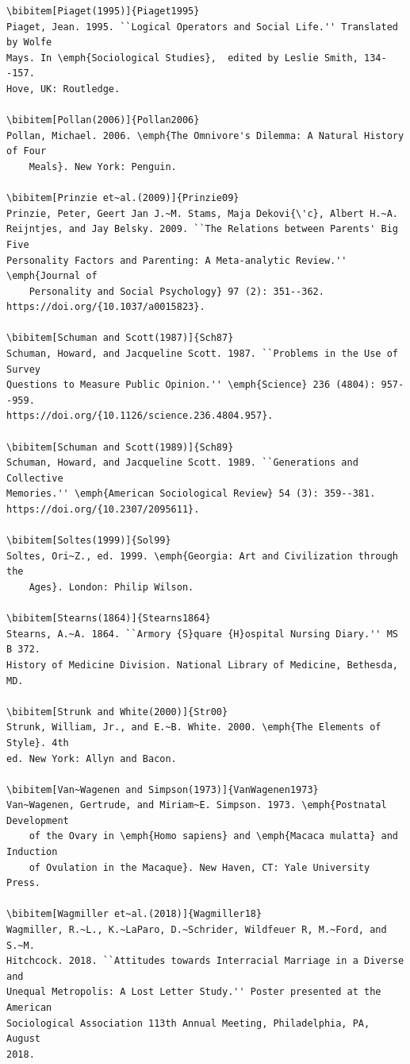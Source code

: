 \documentclass[]{interact}
\theoremstyle{plain}%
\theoremstyle{definition}
\theoremstyle{remark}
\begin{document}
\begin{verbatim}
\bibitem[Piaget(1995)]{Piaget1995}
Piaget, Jean. 1995. ``Logical Operators and Social Life.'' Translated by Wolfe
Mays. In \emph{Sociological Studies},  edited by Leslie Smith, 134--157.
Hove, UK: Routledge.

\bibitem[Pollan(2006)]{Pollan2006}
Pollan, Michael. 2006. \emph{The Omnivore's Dilemma: A Natural History of Four
	Meals}. New York: Penguin.

\bibitem[Prinzie et~al.(2009)]{Prinzie09}
Prinzie, Peter, Geert Jan J.~M. Stams, Maja Dekovi{\'c}, Albert H.~A.
Reijntjes, and Jay Belsky. 2009. ``The Relations between Parents' Big Five
Personality Factors and Parenting: A Meta-analytic Review.'' \emph{Journal of
	Personality and Social Psychology} 97 (2): 351--362.
https://doi.org/{10.1037/a0015823}.

\bibitem[Schuman and Scott(1987)]{Sch87}
Schuman, Howard, and Jacqueline Scott. 1987. ``Problems in the Use of Survey
Questions to Measure Public Opinion.'' \emph{Science} 236 (4804): 957--959.
https://doi.org/{10.1126/science.236.4804.957}.

\bibitem[Schuman and Scott(1989)]{Sch89}
Schuman, Howard, and Jacqueline Scott. 1989. ``Generations and Collective
Memories.'' \emph{American Sociological Review} 54 (3): 359--381.
https://doi.org/{10.2307/2095611}.

\bibitem[Soltes(1999)]{Sol99}
Soltes, Ori~Z., ed. 1999. \emph{Georgia: Art and Civilization through the
	Ages}. London: Philip Wilson.

\bibitem[Stearns(1864)]{Stearns1864}
Stearns, A.~A. 1864. ``Armory {S}quare {H}ospital Nursing Diary.'' MS B 372.
History of Medicine Division. National Library of Medicine, Bethesda, MD.

\bibitem[Strunk and White(2000)]{Str00}
Strunk, William, Jr., and E.~B. White. 2000. \emph{The Elements of Style}. 4th
ed. New York: Allyn and Bacon.

\bibitem[Van~Wagenen and Simpson(1973)]{VanWagenen1973}
Van~Wagenen, Gertrude, and Miriam~E. Simpson. 1973. \emph{Postnatal Development
	of the Ovary in \emph{Homo sapiens} and \emph{Macaca mulatta} and Induction
	of Ovulation in the Macaque}. New Haven, CT: Yale University Press.

\bibitem[Wagmiller et~al.(2018)]{Wagmiller18}
Wagmiller, R.~L., K.~LaParo, D.~Schrider, Wildfeuer R, M.~Ford, and S.~M.
Hitchcock. 2018. ``Attitudes towards Interracial Marriage in a Diverse and
Unequal Metropolis: A Lost Letter Study.'' Poster presented at the American
Sociological Association 113th Annual Meeting, Philadelphia, PA, August
2018.


\end{verbatim}
\end{document}
